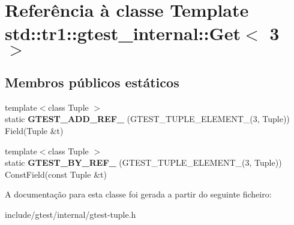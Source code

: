 \hypertarget{classstd_1_1tr1_1_1gtest__internal_1_1Get_3_013_01_4}{\section{Referência à classe Template std\-:\-:tr1\-:\-:gtest\-\_\-internal\-:\-:Get$<$ 3 $>$}
\label{classstd_1_1tr1_1_1gtest__internal_1_1Get_3_013_01_4}
}
\subsection*{Membros públicos estáticos}
\begin{DoxyCompactItemize}
\item 
\hypertarget{classstd_1_1tr1_1_1gtest__internal_1_1Get_3_013_01_4_aa2ebd71eca812f06bad0773a7e2f6788}{{\footnotesize template$<$class Tuple $>$ }\\static {\bfseries G\-T\-E\-S\-T\-\_\-\-A\-D\-D\-\_\-\-R\-E\-F\-\_\-} (G\-T\-E\-S\-T\-\_\-\-T\-U\-P\-L\-E\-\_\-\-E\-L\-E\-M\-E\-N\-T\-\_\-(3, Tuple)) Field(Tuple \&t)}\label{classstd_1_1tr1_1_1gtest__internal_1_1Get_3_013_01_4_aa2ebd71eca812f06bad0773a7e2f6788}

\item 
\hypertarget{classstd_1_1tr1_1_1gtest__internal_1_1Get_3_013_01_4_ab8c5283e6776308abc41aaad518a23c7}{{\footnotesize template$<$class Tuple $>$ }\\static {\bfseries G\-T\-E\-S\-T\-\_\-\-B\-Y\-\_\-\-R\-E\-F\-\_\-} (G\-T\-E\-S\-T\-\_\-\-T\-U\-P\-L\-E\-\_\-\-E\-L\-E\-M\-E\-N\-T\-\_\-(3, Tuple)) Const\-Field(const Tuple \&t)}\label{classstd_1_1tr1_1_1gtest__internal_1_1Get_3_013_01_4_ab8c5283e6776308abc41aaad518a23c7}

\end{DoxyCompactItemize}


A documentação para esta classe foi gerada a partir do seguinte ficheiro\-:\begin{DoxyCompactItemize}
\item 
include/gtest/internal/gtest-\/tuple.\-h\end{DoxyCompactItemize}
